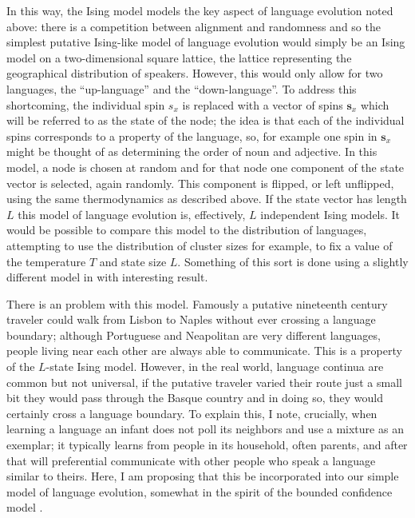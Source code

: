 \documentclass[letterpaper]{article}
\begin{document}
In this way, the Ising model models the key aspect of language evolution noted above: there is a competition between alignment and randomness and so the simplest putative Ising-like model of language evolution would simply be an Ising model on a two-dimensional square lattice, the lattice representing the geographical distribution of speakers. However, this would only allow for two languages, the ``up-language'' and the ``down-language''. To address this shortcoming, the individual spin $s_x$ is replaced with a vector of spins $\textbf{s}_x$ which will be referred to as the state of the node; the idea is that each of the individual spins corresponds to a property of the language, so, for example one spin in $\textbf{s}_x$ might be thought of as determining the order of noun and adjective. In this model, a node is chosen at random and for that node one component of the state vector is selected, again randomly. This component is flipped, or left unflipped, using the same thermodynamics as described above. If the state vector has length $L$ this model of language evolution is, effectively, $L$ independent Ising models. It would be possible to compare this model to the distribution of languages, attempting to use the distribution of cluster sizes for example, to fix a value of the temperature $T$ and state size $L$. Something of this sort is done using a slightly different model in \cite{SivaEtAl2015,SivaEtAl2017} with interesting result.

There is an  problem with this model. Famously a putative nineteenth century traveler could walk from Lisbon to Naples without ever crossing a language boundary; although Portuguese and Neapolitan are very different languages, people living near each other are always able to communicate. This is a property of the $L$-state Ising model. However, in the real world, language continua are common but not universal, if the putative traveler varied their route just a small bit they would pass through the Basque country and in doing so, they would certainly cross a language boundary. To explain this, I note, crucially, when learning a language an infant does not poll its neighbors and use a mixture as an exemplar; it typically learns from people in its household, often parents, and after that will preferential communicate with other people who speak a language similar to theirs. Here, I am proposing that this be incorporated into our simple model of language evolution, somewhat in the spirit of the bounded confidence model \cite{HegselmannKrause2019}.
\end{document}
